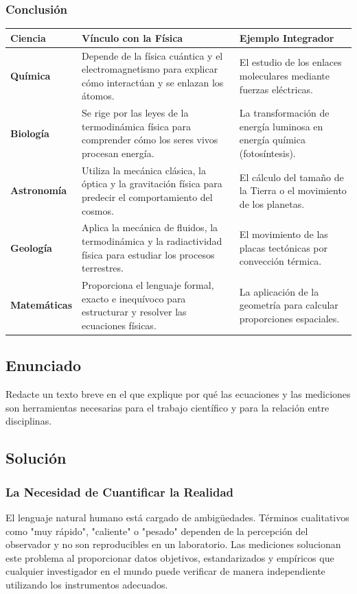 \documentclass[12pt, a4paper]{article}
\begin{document}
\subsubsection*{Conclusión}
\begin{center}
\renewcommand{\arraystretch}{1.5}
\begin{tabular}{|p{2.5cm}|p{6cm}|p{5cm}|}
\hline
\textbf{Ciencia} & \textbf{Vínculo con la Física} & \textbf{Ejemplo Integrador} \\
\hline
\textbf{Química} & Depende de la física cuántica y el electromagnetismo para explicar cómo interactúan y se enlazan los átomos. & El estudio de los enlaces moleculares mediante fuerzas eléctricas. \\
\hline
\textbf{Biología} & Se rige por las leyes de la termodinámica física para comprender cómo los seres vivos procesan energía. & La transformación de energía luminosa en energía química (fotosíntesis). \\
\hline
\textbf{Astronomía} & Utiliza la mecánica clásica, la óptica y la gravitación física para predecir el comportamiento del cosmos. & El cálculo del tamaño de la Tierra o el movimiento de los planetas. \\
\hline
\textbf{Geología} & Aplica la mecánica de fluidos, la termodinámica y la radiactividad física para estudiar los procesos terrestres. & El movimiento de las placas tectónicas por convección térmica. \\
\hline
\textbf{Matemáticas} & Proporciona el lenguaje formal, exacto e inequívoco para estructurar y resolver las ecuaciones físicas. & La aplicación de la geometría para calcular proporciones espaciales. \\
\hline
\end{tabular}
\end{center}

\newpage

\subsection*{Enunciado}
Redacte un texto breve en el que explique por qué las ecuaciones y las mediciones son herramientas necesarias para el trabajo científico y para la relación entre disciplinas.

\subsection*{Solución}

\subsubsection*{La Necesidad de Cuantificar la Realidad}
El lenguaje natural humano está cargado de ambigüedades. Términos cualitativos como "muy rápido", "caliente" o "pesado" dependen de la percepción del observador y no son reproducibles en un laboratorio. Las mediciones solucionan este problema al proporcionar datos objetivos, estandarizados y empíricos que cualquier investigador en el mundo puede verificar de manera independiente utilizando los instrumentos adecuados.
\end{document}
